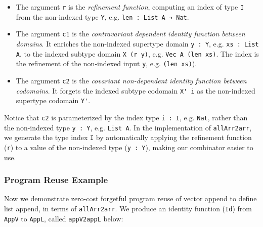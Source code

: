 \documentclass[acmsmall]{acmart}\settopmatter{}
\begin{document}
\begin{itemize}
\item The argument \verb;r;  is the
  \textit{refinement function}, computing an
  index of type \verb;I; from the
  non-indexed type \verb;Y;, e.g. \verb;len : List A ➔ Nat;.

\item The argument \verb;c1; is the
  \textit{contravariant dependent identity function between domains}.
  It enriches the non-indexed supertype domain \verb;y : Y;,
  e.g. \verb;xs : List A;.
  to the indexed subtype domain \verb;X (r y);,
  e.g. \verb;Vec A (len xs);.
  The index is the refinement
  of the non-indexed input \verb;y;, e.g. \verb;(len xs);).

\item The argument \verb;c2; is the
  \textit{covariant non-dependent identity function between codomains}.
  It forgets the indexed subtype codomain \verb;X' i;
  as the non-indexed supertype codomain \verb;Y';.
\end{itemize}

Notice that \verb;c2; is parameterized by the index type \verb;i : I;,
e.g. \verb;Nat;, rather than the non-indexed type \verb;y : Y;,
e.g. \verb;List A;. In the implementation of \verb;allArr2arr;, we
generate the type index \verb;I; by automatically applying the
refinement function (\verb;r;) to a value of the non-indexed type
(\verb;y : Y;), making our combinator easier to use.

\subsubsection{Program Reuse Example}

Now we demonstrate zero-cost forgetful program reuse of vector append
to define list append, in terms of \verb;allArr2arr;. We produce
an identity function (\verb;Id;) from \verb;AppV; to \verb;AppL;,
called \verb;appV2appL; below:
\end{document}
